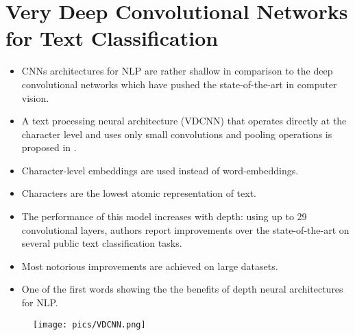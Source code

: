 \section{Very Deep Convolutional Networks for Text Classification}
\begin{itemize}
\item CNNs architectures for NLP are rather shallow in comparison to the deep convolutional networks which have pushed the state-of-the-art in computer vision.
\item A text processing neural architecture (VDCNN) that operates directly at the character level and uses only small convolutions and pooling operations is proposed in \cite{conneau2017very}.

\item Character-level embeddings are used instead of word-embeddings.

\item Characters are the lowest atomic representation of text. 

\item The performance of this model increases with depth: using up to 29 convolutional layers, authors report improvements over the state-of-the-art on several public text classification tasks. 

\item Most notorious improvements are achieved on large datasets.

\item One of the first words showing the the benefits of  depth neural architectures for NLP.
\end{itemize}




  \begin{figure}[h]
        	\texttt{[image: pics/VDCNN.png]}
        \end{figure}

